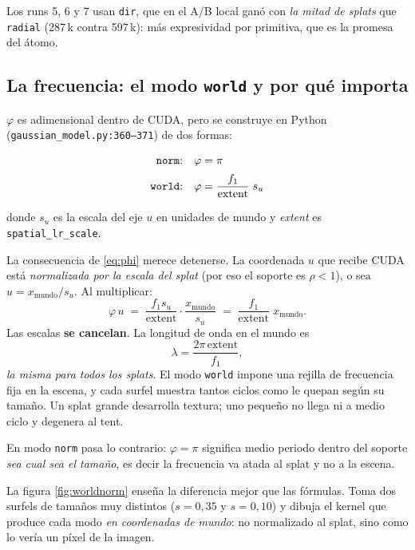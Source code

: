 \documentclass[12pt]{extarticle}
\newcommand{\code}[1]{\texttt{#1}}
\begin{document}
Los runs 5, 6 y 7 usan \code{dir}, que en el A/B local ganó con \emph{la mitad
de splats} que \code{radial} (287\,k contra 597\,k): más expresividad por
primitiva, que es la promesa del átomo.

\subsection{La frecuencia: el modo \code{world} y por qué importa}

$\varphi$ es adimensional dentro de CUDA, pero se construye en Python
(\code{gaussian\_model.py:360--371}) de dos formas:

\begin{align}
\text{\code{norm}:}\quad & \varphi=\pi \\[0.2em]
\text{\code{world}:}\quad & \varphi=\frac{f_1}{\text{extent}}\; s_u
\label{eq:phi}
\end{align}

donde $s_u$ es la escala del eje $u$ en unidades de mundo y \emph{extent} es
\code{spatial\_lr\_scale}.

La consecuencia de \eqref{eq:phi} merece detenerse. La coordenada $u$ que
recibe CUDA está \emph{normalizada por la escala del splat} (por eso el
soporte es $\rho<1$), o sea $u = x_{\text{mundo}}/s_u$. Al multiplicar:
\[
\varphi\,u \;=\; \frac{f_1 s_u}{\text{extent}}\cdot\frac{x_{\text{mundo}}}{s_u}
\;=\; \frac{f_1}{\text{extent}}\;x_{\text{mundo}} .
\]
Las escalas \textbf{se cancelan}. La longitud de onda en el mundo es
\[
\lambda = \frac{2\pi\,\text{extent}}{f_1},
\]
\emph{la misma para todos los splats}. El modo \code{world} impone una rejilla
de frecuencia fija en la escena, y cada surfel muestra tantos ciclos como le
quepan según su tamaño. Un splat grande desarrolla textura; uno pequeño no
llega ni a medio ciclo y degenera al tent.

En modo \code{norm} pasa lo contrario: $\varphi=\pi$ significa medio periodo
dentro del soporte \emph{sea cual sea el tamaño}, es decir la frecuencia va
atada al splat y no a la escena.

La figura \ref{fig:worldnorm} enseña la diferencia mejor que las fórmulas.
Toma dos surfels de tamaños muy distintos ($s=0{,}35$ y $s=0{,}10$) y dibuja el
kernel que produce cada modo \emph{en coordenadas de mundo}: no normalizado al
splat, sino como lo vería un píxel de la imagen.
\end{document}
